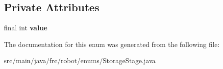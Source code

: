 \subsection*{Private Attributes}
\begin{DoxyCompactItemize}
\item 
\mbox{\label{enumfrc_1_1robot_1_1enums_1_1_storage_stage_a689087153a1942bb4c20cc74e2305c51}} 
final int {\bfseries value}
\end{DoxyCompactItemize}


The documentation for this enum was generated from the following file\+:\begin{DoxyCompactItemize}
\item 
src/main/java/frc/robot/enums/Storage\+Stage.\+java\end{DoxyCompactItemize}
